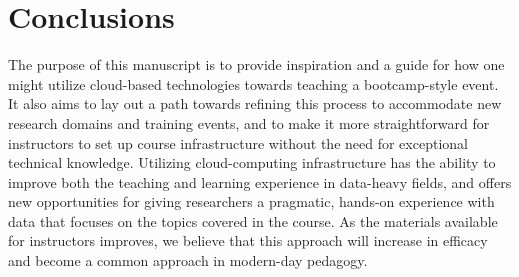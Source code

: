 \section{Conclusions}

The purpose of this manuscript is to provide inspiration
and a guide for how one might utilize cloud-based technologies towards teaching a
bootcamp-style event. It also aims to lay out a path towards refining this
process to accommodate new research domains and training events, and to make it
more straightforward for instructors to set up course infrastructure without the
need for exceptional technical knowledge. Utilizing cloud-computing
infrastructure has the ability to improve both the teaching and learning
experience in data-heavy fields, and offers new opportunities for giving
researchers a pragmatic, hands-on experience with data that focuses on the
topics covered in the course. As the materials available for instructors
improves, we believe that this approach will increase in efficacy and become a
common approach in modern-day pedagogy.
